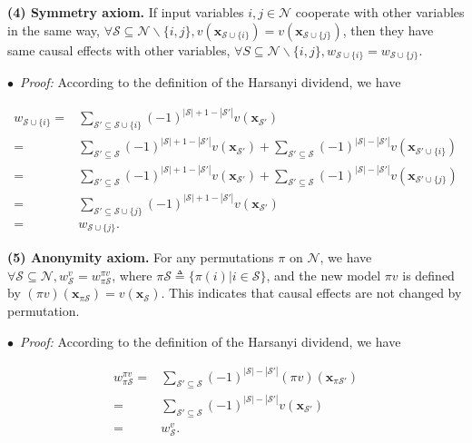 \textbf{(4) Symmetry axiom.} If input variables {\small $i,j\in \mathcal{N}$} cooperate with other variables in the same way, {\small $\forall \mathcal{S}\subseteq \mathcal{N}\backslash\{i,j\}, v(\boldsymbol{x}_{\mathcal{S}\cup\{i\}})=v(\boldsymbol{x}_{\mathcal{S}\cup\{j\}})$}, then they have same causal effects with other variables, {\small $\forall S\subseteq \mathcal{N}\backslash\{i,j\}, w_{\mathcal{S}\cup\{i\}}=w_{\mathcal{S}\cup\{j\}}$}.

$\bullet$~\textit{Proof:} According to the definition of the Harsanyi dividend, we have

\begin{small}
\begin{align*}
w_{\mathcal{S}\cup\{i\}} =& \sum_{\mathcal{S}'\subseteq \mathcal{S}\cup\{i\}} (-1)^{|\mathcal{S}|+1-|\mathcal{S}'|}v(\boldsymbol{x}_{\mathcal{S}'})\\
=& \sum_{\mathcal{S}'\subseteq \mathcal{S}} (-1)^{|\mathcal{S}|+1-|\mathcal{S}'|}v(\boldsymbol{x}_{\mathcal{S}'}) + \sum_{\mathcal{S}'\subseteq \mathcal{S}} (-1)^{|\mathcal{S}|-|\mathcal{S}'|}v(\boldsymbol{x}_{\mathcal{S}'\cup\{i\}})\\
=& \sum_{\mathcal{S}'\subseteq \mathcal{S}} (-1)^{|\mathcal{S}|+1-|\mathcal{S}'|}v(\boldsymbol{x}_{\mathcal{S}'}) + \sum_{\mathcal{S}'\subseteq \mathcal{S}} (-1)^{|\mathcal{S}|-|\mathcal{S}'|}v(\boldsymbol{x}_{\mathcal{S}'\cup\{j\}})\\
=& \sum_{\mathcal{S}'\subseteq \mathcal{S}\cup\{j\}} (-1)^{|\mathcal{S}|+1-|\mathcal{S}'|}v(\boldsymbol{x}_{\mathcal{S}'})\\
=& w_{\mathcal{S}\cup\{j\}}.
\end{align*}
\end{small}

\textbf{(5) Anonymity axiom.} For any permutations $\pi$ on {\small $\mathcal{N}$}, we have {\small $\forall \mathcal{S}
\!\subseteq\! \mathcal{N}, w^v_{\mathcal{S}}\!=\!w^{\pi v}_{\pi \mathcal{S}}$}, where {\small $\pi \mathcal{S} \!\triangleq\!\{\pi(i)|i\!\in\! \mathcal{S}\}$}, and the new model {\small $\pi v$} is defined by {\small $(\pi v)(\boldsymbol{x}_{\pi\mathcal{S}})\!=\!v(\boldsymbol{x}_{\mathcal{S}})$}.
This indicates that causal effects are not changed by permutation.

$\bullet$~\textit{Proof:} According to the definition of the Harsanyi dividend, we have

\begin{small}
\begin{align*}
w^{\pi v}_{\pi \mathcal{S}}=& \sum_{\mathcal{S}'\subseteq \mathcal{S}} (-1)^{|\mathcal{S}|-|\mathcal{S}'|} (\pi v)(\boldsymbol{x}_{\pi\mathcal{S}'})\\
=& \sum_{\mathcal{S}'\subseteq \mathcal{S}} (-1)^{|\mathcal{S}|-|\mathcal{S}'|} v(\boldsymbol{x}_{\mathcal{S}'})\\
=& w^v_{\mathcal{S}}.
\end{align*}
\end{small}

